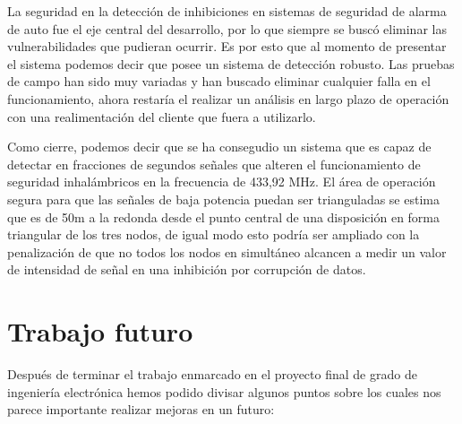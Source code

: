 La seguridad en la detección de inhibiciones en sistemas de seguridad de alarma de auto fue el eje central del desarrollo, por 
lo que siempre se buscó eliminar las vulnerabilidades que pudieran ocurrir. Es por esto que al momento de presentar el sistema
podemos decir que posee un sistema de detección robusto. Las pruebas de campo han sido muy variadas y han buscado eliminar
cualquier falla en el funcionamiento, ahora restaría el realizar un análisis en largo plazo de operación con una realimentación
del cliente que fuera a utilizarlo. \par
Como cierre, podemos decir que se ha consegudio un sistema que es capaz de detectar en fracciones de segundos señales que 
alteren el funcionamiento de seguridad inhalámbricos en la frecuencia de 433,92 MHz. El área de operación segura para que las
señales de baja potencia puedan ser trianguladas se estima que es de 50m a la redonda desde el punto central de una disposición
en forma triangular de los tres nodos, de igual modo esto podría ser ampliado con la penalización de que no todos los nodos en 
simultáneo alcancen a medir un valor de intensidad de señal en una inhibición por corrupción de datos. \par


\section{Trabajo futuro} \par

Después de terminar el trabajo enmarcado en el proyecto final de grado de ingeniería electrónica hemos podido divisar algunos
puntos sobre los cuales nos parece importante realizar mejoras en un futuro:

